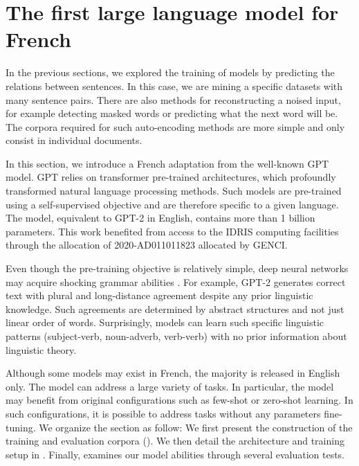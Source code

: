 \setchapterpreamble[u]{\margintoc}
\chapter{The first large language model for French}


In the previous sections, we explored the training of models by predicting the relations between sentences. In this case, we are mining a specific datasets with many sentence pairs. There are also methods for reconstructing a noised input, for example detecting masked words or predicting what the next word will be. The corpora required for such auto-encoding methods are more simple and only consist in individual documents.

In this section, we introduce a French adaptation from the well-known GPT model. GPT relies on transformer pre-trained architectures, which profoundly transformed natural language processing methods. Such models are pre-trained using a self-supervised objective and are therefore specific to a given language. The model, equivalent to GPT-2 in English, contains more than 1 billion parameters. This work benefited from access to the IDRIS computing facilities through the allocation of 2020-AD011011823 allocated by GENCI.

Even though the pre-training objective is relatively simple, deep neural networks may acquire shocking grammar abilities \parencite{linzen_2020}. For example, GPT-2 generates correct text with plural and long-distance agreement despite any prior linguistic knowledge. Such agreements are determined by abstract structures and not just linear order of words. Surprisingly, models can learn such specific linguistic patterns (subject-verb, noun-adverb, verb-verb) with no prior information about linguistic theory. 

Although some models may exist in French, the majority is released in English only. The model can address a large variety of tasks. In particular, the model may benefit from original configurations such as few-shot or zero-shot learning. In such configurations, it is possible to address tasks without any parameters fine-tuning. We organize the section as follow: We first present the construction of the training and evaluation corpora (). We then detail the architecture and training setup in . Finally,   examines our model abilities through several evaluation tests.

